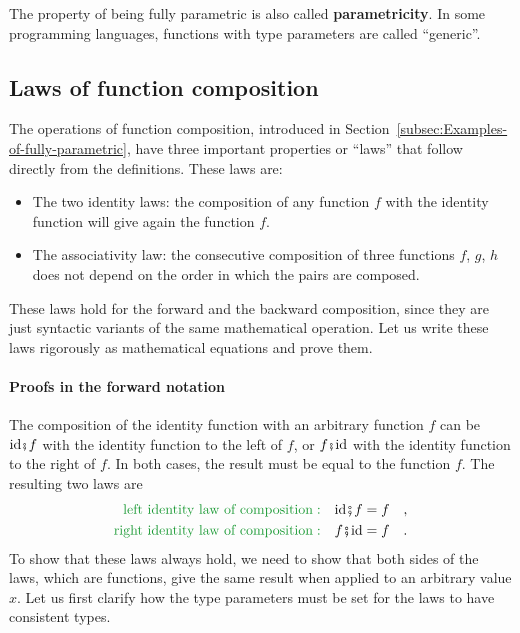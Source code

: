 The property of being fully parametric is also called \textbf{parametricity}.
In some programming languages, functions with type parameters are
called ``generic''.

\subsection{Laws of function composition\label{subsec:Laws-of-function-composition}}

The operations of function composition, introduced in Section~\ref{subsec:Examples-of-fully-parametric},
have three important properties or ``laws'' that follow directly
from the definitions. These laws are:
\begin{itemize}
\item The two identity laws: the composition of any function $f$ with the
identity function will give again the function $f$.
\item The associativity law: the consecutive composition of three functions
$f$, $g$, $h$ does not depend on the order in which the pairs are
composed.
\end{itemize}
These laws hold for the forward and the backward composition, since
they are just syntactic variants of the same mathematical operation.
Let us write these laws rigorously as mathematical equations and prove
them.

\paragraph{Proofs in the forward notation}

The composition of the identity function with an arbitrary function
$f$ can be $\text{id}\bef f$ with the identity function to the left
of $f$, or $f\bef\text{id}$ with the identity function to the right
of $f$. In both cases, the result must be equal to the function $f$.
The resulting two laws are
\begin{align*}
{\color{greenunder}\text{left identity law of composition}:}\quad & \text{id}\bef f=f\quad,\\
{\color{greenunder}\text{right identity law of composition}:}\quad & f\bef\text{id}=f\quad.
\end{align*}
To show that these laws always hold, we need to show that both sides
of the laws, which are functions, give the same result when applied
to an arbitrary value $x$. Let us first clarify how the type parameters
must be set for the laws to have consistent types.

